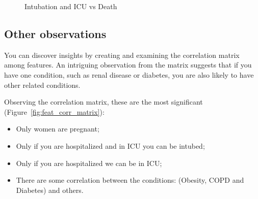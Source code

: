 \begin{figure}[H]%
    \caption{Intubation and ICU vs Death}%
    \label{fig:intubation_insights_outcome}%
    \centering
    \qquad
\end{figure}

\subsection{Other observations}

You can discover insights by creating and examining the correlation matrix among features. An intriguing observation from the matrix suggests that if you have one condition, such as renal disease or diabetes, you are also likely to have other related conditions.

Observing the correlation matrix, these are the most significant (Figure~\ref{fig:feat_corr_matrix}):
\begin{itemize}
    \item Only women are pregnant;
    \item Only if you are hospitalized and in ICU you can be intubed;
    \item Only if you are hospitalized we can be in ICU;
    \item There are some correlation between the conditions: (Obesity, COPD and Diabetes) and others.
\end{itemize}






